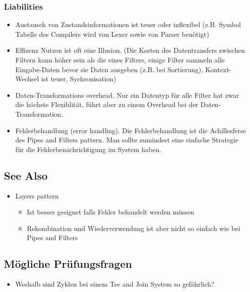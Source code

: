 \subsubsection*{Liabilities}


\begin{itemize}
	\item Austausch von Zustandsinformationen ist teuer oder inflexibel (z.B. Symbol Tabelle des Compilers wird von Lexer sowie von Parser benötigt)
	\item Effizenz Nutzen ist oft eine Illusion. (Die Kosten des Datentransfers zwischen Filtern kann höher sein als die eines Filters, einige Filter sammeln alle Eingabe-Daten bevor sie Daten ausgeben (z.B. bei Sortierung), Kontext-Wechsel ist teuer, Sychronisation)
	\item Daten-Transformations overhead. Nur ein Datentyp für alle Filter hat zwar die höchste Flexiblität, führt aber zu einem Overhead bei der Daten-Transformation.
	\item Fehlerbehandlung (error handling). Die Fehlerbehandlung ist die Achillesferse des Pipes and Filters pattern. Man sollte zumindest eine einfache Strategie für die Fehlerbenachrichtigung im System haben.
\end{itemize}

\subsection*{See Also}


\begin{itemize}
	\item Layers pattern
	\begin{itemize}
		\item Ist besser geeignet falls Fehler behandelt werden müssen
		\item Rekombination und Wiederverwendung ist aber nicht so einfach wie bei Pipes and Filters
	\end{itemize}
\end{itemize}

\subsection*{Mögliche Prüfungsfragen}


\begin{itemize}
	\item Weshalb sind Zyklen bei einem Tee and Join System so gefährlich?
\end{itemize}

